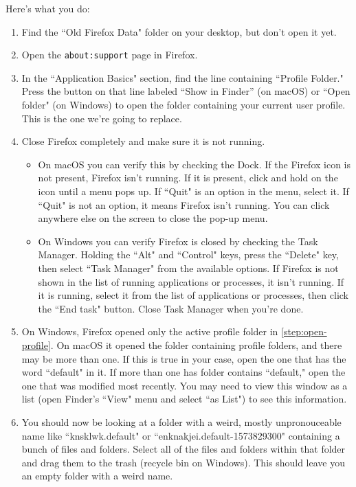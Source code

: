 \documentclass[fontsize=11pt]{article}
\begin{document}
Here's what you do:
\begin{enumerate}
	\item Find the ``Old Firefox Data" folder on your desktop, but don't open it yet.
	\item Open the \texttt{about:support} page in Firefox.
	\item \label{step:open-profile} In the ``Application Basics" section, find the line containing ``Profile Folder."  Press the button on that line labeled ``Show in Finder'' (on macOS) or ``Open folder" (on Windows) to open the folder containing your current user profile.  This is the one we're going to replace.
	\item Close Firefox completely and make sure it is not running.
	\begin{itemize}
		\item On macOS you can verify this by checking the Dock.  If the Firefox icon is not present, Firefox isn't running.  If it is present, click and hold on the icon until a menu pops up.  If ``Quit" is an option in the menu, select it.  If ``Quit" is not an option, it means Firefox isn't running.  You can click anywhere else on the screen to close the pop-up menu.
		\item On Windows you can verify Firefox is closed by checking the Task Manager.  Holding the ``Alt" and ``Control" keys, press the ``Delete" key, then select ``Task Manager" from the available options.  If Firefox is not shown in the list of running applications or processes, it isn't running.  If it is running, select it from the list of applications or processes, then click the ``End task" button.  Close Task Manager when you're done.
	\end{itemize}
	\item On Windows, Firefox opened only the active profile folder in \cref{step:open-profile}.  On macOS it opened the folder containing profile folders, and there may be more than one.  If this is true in your case, open the one that has the word ``default" in it.  If more than one has folder contains ``default," open the one that was modified most recently.  You may need to view this window as a list (open Finder's ``View" menu and select ``as List") to see this information.
	\item You should now be looking at a folder with a weird, mostly unpronouceable name like ``knsklwk.default" or ``enknakjei.default-1573829300" containing a bunch of files and folders.  Select all of the files and folders within that folder and drag them to the trash (recycle bin on Windows).  This should leave you an empty folder with a weird name.

\end{enumerate}
\end{document}
